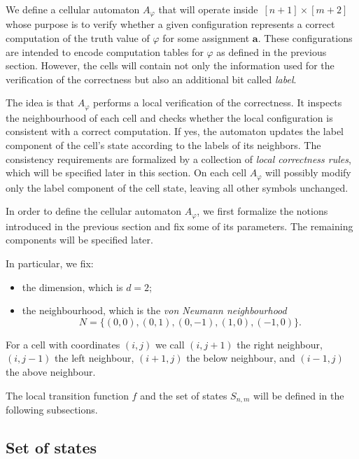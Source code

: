 \documentclass{article}
\theoremstyle{plain}
\theoremstyle{definition}
\newcommand{\tuple}{\mathbf}
\begin{document}
We define a cellular automaton $A_{\varphi}$ that will operate inside~$[n+1]\times[m+2]$ whose purpose is to verify whether a given configuration represents a correct computation of the truth value of $\varphi$ for some assignment $\tuple a$. These configurations are intended to encode computation tables
for $\varphi$ as defined in the previous section. However, the cells will contain not only the information used for the verification of the correctness but also an additional bit called \emph{label}.

The idea is that $A_{\varphi}$ performs a local verification of the correctness. It inspects the neighbourhood of each cell and checks  whether the local configuration is consistent with a correct computation. If yes, the automaton updates the label component of the cell's state according to the labels of its neighbors. The consistency requirements are formalized by a collection of \emph{local correctness rules}, which will be specified later in this section.  On each cell $A_{\varphi}$  will possibly modify only the label component of the cell state, leaving all other symbols unchanged.

In order to define the cellular automaton $A_\varphi$, we first formalize the notions
introduced in the previous section and fix some of its parameters.
The remaining components will be specified later.

In particular,  we fix:
\begin{itemize}
    \item the dimension, which is $d=2$;
    \item the neighbourhood, which is the \emph{von Neumann neighbourhood}
    \[
        N = \{(0,0), (0,1), (0,-1), (1,0), (-1,0)\}.
    \]
\end{itemize}

For a cell with coordinates $(i,j)$ we call $(i,j+1)$ the right neighbour, $(i,j-1)$ the left neighbour, $(i+1,j)$ the below neighbour, and $(i-1,j)$ the above neighbour.


The local transition function $f$ and the set of states $S_{n,m}$ will be defined in the following subsections.


\subsection{Set of states}\label{states}
\end{document}
